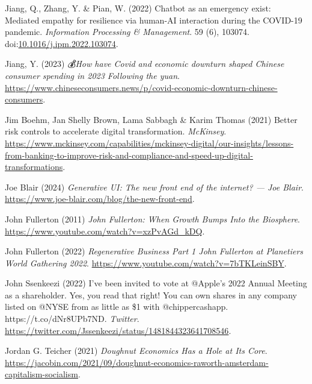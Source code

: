 \documentclass[
  letterpaper,
  DIV=11,
  numbers=noendperiod]{scrartcl}
\newlength{\cslhangindent}
\newenvironment{CSLReferences}[2] %
 {\begin{list}{}{%
  \setlength{\itemindent}{0pt}
  \setlength{\leftmargin}{0pt}
  \setlength{\parsep}{0pt}
  \ifodd #1
   \setlength{\leftmargin}{\cslhangindent}
   \setlength{\itemindent}{-1\cslhangindent}
  \fi
  \setlength{\itemsep}{#2\baselineskip}}}
 {\end{list}}
\begin{document}
\begin{CSLReferences}{0}{1}
Jiang, Q., Zhang, Y. \& Pian, W. (2022) Chatbot as an emergency exist:
{Mediated} empathy for resilience via human-{AI} interaction during the
{COVID-19} pandemic. \emph{Information Processing \& Management}. 59
(6), 103074.
doi:\href{https://doi.org/10.1016/j.ipm.2022.103074}{10.1016/j.ipm.2022.103074}.

Jiang, Y. (2023) \emph{💰{How} have {Covid} and economic downturn shaped
{Chinese} consumer spending in 2023 {\textbar} {Following} the yuan}.
\url{https://www.chineseconsumers.news/p/covid-economic-downturn-chinese-consumers}.

Jim Boehm, Jan Shelly Brown, Lama Sabbagh \& Karim Thomas (2021) Better
risk controls to accelerate digital transformation. \emph{McKinsey}.
\url{https://www.mckinsey.com/capabilities/mckinsey-digital/our-insights/lessons-from-banking-to-improve-risk-and-compliance-and-speed-up-digital-transformations}.

Joe Blair (2024) \emph{Generative {UI}: The new front end of the
internet? --- {Joe Blair}}.
\url{https://www.joe-blair.com/blog/the-new-front-end}.

John Fullerton (2011) \emph{John {Fullerton}: {When Growth Bumps Into}
the {Biosphere}}. \url{https://www.youtube.com/watch?v=xzPvAGd_kDQ}.

John Fullerton (2022) \emph{Regenerative {Business Part} 1 {\textbar}
{John Fullerton} at {Planetiers World Gathering} 2022}.
\url{https://www.youtube.com/watch?v=7bTKLeinSBY}.

John Ssenkeezi (2022) I've been invited to vote at @{Apple}'s 2022
{Annual Meeting} as a shareholder. {Yes}, you read that right! {You} can
own shares in any company listed on @{NYSE} from as little as \$1 with
@chippercashapp. {https://t.co/dNr8UPb7ND}. \emph{Twitter}.
\url{https://twitter.com/Jssenkeezi/status/1481844323641708546}.

Jordan G. Teicher (2021) \emph{Doughnut {Economics Has} a {Hole} at {Its
Core}}.
\url{https://jacobin.com/2021/09/doughnut-economics-raworth-amsterdam-capitalism-socialism}.


\end{CSLReferences}
\end{document}
